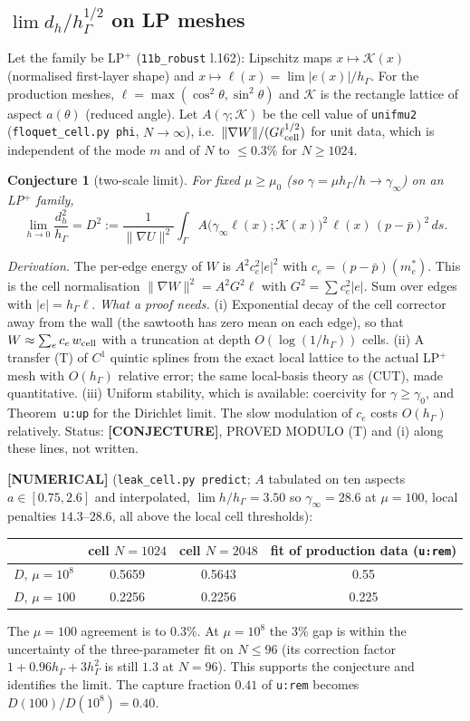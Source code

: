 \documentclass[11pt]{article}
\newtheorem{conjecture}[theorem]{Conjecture}
\theoremstyle{definition}
\theoremstyle{remark}
\newcommand{\hG}{h_\Gamma}
\newcommand{\norm}[1]{\|#1\|}
\newcommand{\pbar}{\bar p}
\newcommand{\lab}[1]{\textbf{[#1]}}
\begin{document}
\subsection{$\lim d_h/\hG^{1/2}$ on LP meshes}
Let the family be LP$^+$ (\texttt{11b\_robust} l.162): Lipschitz maps $x\mapsto\mathcal K(x)$ (normalised first-layer shape) and $x\mapsto\ell(x)=\lim|e(x)|/\hG$. For the production meshes, $\ell=\max(\cos^2\theta,\sin^2\theta)$ and $\mathcal K$ is the rectangle lattice of aspect $a(\theta)$ (reduced angle). Let $A(\gamma;\mathcal K)$ be the cell value of \texttt{unifmu2} (\texttt{floquet\_cell.py phi}, $N\to\infty$), i.e.\ $\norm{\nabla W}/(G\ell_{\rm cell}^{1/2})$ for unit data, which is independent of the mode $m$ and of $N$ to $\le0.3\%$ for $N\ge1024$.

\begin{conjecture}[two-scale limit]\label{conj:dh}
For fixed $\mu\ge\mu_0$ (so $\gamma=\mu\hG/h\to\gamma_\infty$) on an LP$^+$ family,
\[
\lim_{h\to0}\frac{d_h^2}{\hG}=D^2:=\frac1{\norm{\nabla U}^2}\int_\Gamma A\bigl(\gamma_\infty\ell(x);\mathcal K(x)\bigr)^2\,\ell(x)\,(p-\pbar)^2\,ds .
\]
\end{conjecture}
\emph{Derivation.} The per-edge energy of $W$ is $A^2c_e^2|e|^2$ with $c_e=(p-\pbar)(m_e^\ast)$. This is the cell normalisation $\norm{\nabla W}^2=A^2G^2\ell$ with $G^2=\sum c_e^2|e|$. Sum over edges with $|e|=\hG\ell$.
\emph{What a proof needs.} (i) Exponential decay of the cell corrector away from the wall (the sawtooth has zero mean on each edge), so that $W\approx\sum_ec_e\,w_{\rm cell}$ with a truncation at depth $O(\log(1/\hG))$ cells. (ii) A transfer (T) of $C^1$ quintic splines from the exact local lattice to the actual LP$^+$ mesh with $O(\hG)$ relative error; the same local-basis theory as (CUT), made quantitative. (iii) Uniform stability, which is available: coercivity for $\gamma\ge\gamma_0$, and Theorem~\texttt{u:up} for the Dirichlet limit. The slow modulation of $c_e$ costs $O(\hG)$ relatively. Status: \lab{CONJECTURE}, PROVED MODULO (T) and (i) along these lines, not written.

\lab{NUMERICAL} (\texttt{leak\_cell.py predict}; $A$ tabulated on ten aspects $a\in[0.75,2.6]$ and interpolated, $\lim h/\hG=3.50$ so $\gamma_\infty=28.6$ at $\mu=100$, local penalties $14.3$--$28.6$, all above the local cell thresholds):
\begin{center}\small
\begin{tabular}{l|cc|c}
\toprule
 & cell $N=1024$ & cell $N=2048$ & fit of production data (\texttt{u:rem})\\
\midrule
$D$, $\mu=10^8$ & 0.5659 & 0.5643 & 0.55\\
$D$, $\mu=100$ & 0.2256 & 0.2256 & 0.225\\
\bottomrule
\end{tabular}
\end{center}
The $\mu=100$ agreement is to $0.3\%$. At $\mu=10^8$ the $3\%$ gap is within the uncertainty of the three-parameter fit on $N\le96$ (its correction factor $1+0.96\hG+3\hG^2$ is still $1.3$ at $N=96$). This supports the conjecture and identifies the limit. The capture fraction $0.41$ of \texttt{u:rem} becomes $D(100)/D(10^8)=0.40$.
\end{document}
